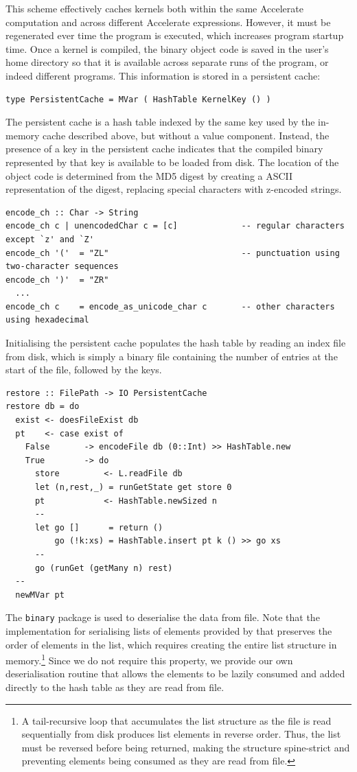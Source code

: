 This scheme effectively caches kernels both within the same Accelerate
computation and across different Accelerate expressions. However, it must be
regenerated ever time the program is executed, which increases program startup
time. Once a kernel is compiled, the binary object code is saved in the user's
home directory so that it is available across separate runs of the program, or
indeed different programs. This information is stored in a persistent cache:
%
\begin{lstlisting}[style=haskell,numbers=none]
type PersistentCache = MVar ( HashTable KernelKey () )
\end{lstlisting}

The persistent cache is a hash table indexed by the same key used by the
in-memory cache described above, but without a value component. Instead, the
presence of a key in the persistent cache indicates that the compiled binary
represented by that key is available to be loaded from disk. The location of the
object code is determined from the MD5 digest by creating a ASCII representation
of the digest, replacing special characters with z-encoded strings.
%
\begin{lstlisting}[style=haskell]
encode_ch :: Char -> String
encode_ch c | unencodedChar c = [c]             -- regular characters except `z' and `Z'
encode_ch '('  = "ZL"                           -- punctuation using two-character sequences
encode_ch ')'  = "ZR"
  ...
encode_ch c    = encode_as_unicode_char c       -- other characters using hexadecimal
\end{lstlisting}

Initialising the persistent cache populates the hash table by reading an index
file from disk, which is simply a binary file containing the number of entries
at the start of the file, followed by the keys.
%
\begin{lstlisting}[style=haskell]
restore :: FilePath -> IO PersistentCache
restore db = do
  exist <- doesFileExist db
  pt    <- case exist of
    False       -> encodeFile db (0::Int) >> HashTable.new
    True        -> do
      store         <- L.readFile db
      let (n,rest,_) = runGetState get store 0
      pt            <- HashTable.newSized n
      --
      let go []      = return ()
          go (!k:xs) = HashTable.insert pt k () >> go xs
      --
      go (runGet (getMany n) rest)
  --
  newMVar pt
\end{lstlisting}

The \texttt{binary} package is used to deserialise the data from file. Note that
the implementation for serialising lists of elements provided by that preserves
the order of elements in the list, which requires creating the entire list
structure in memory.\footnote{A tail-recursive loop that accumulates the list
structure as the file is read sequentially from disk produces list elements in
reverse order. Thus, the list must be reversed before being returned, making the
structure spine-strict and preventing elements being consumed as they are read
from file.} Since we do not require this property, we provide our own
deserialisation routine that allows the elements to be lazily consumed and added
directly to the hash table as they are read from file.

